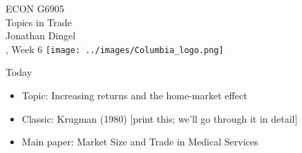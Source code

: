 \documentclass[11pt,notes=hide,aspectratio=169]{beamer}
\begin{document}
\begin{frame}[plain]
\begin{center}
\large
\textcolor{columbiadarkblue}{ECON G6905\\
Topics in Trade\\ 
Jonathan Dingel\\
\semester, Week 6}
\vfill 
\texttt{[image: ../images/Columbia\_logo.png]}
\end{center}
\end{frame}
\begin{frame}{Today}
\begin{itemize}
	\item Topic: Increasing returns and the home-market effect
	\item Classic: Krugman (1980) [print this; we'll go through it in detail]
	\item Main paper: Market Size and Trade in Medical Services
\end{itemize}
\end{frame}
\end{document}
